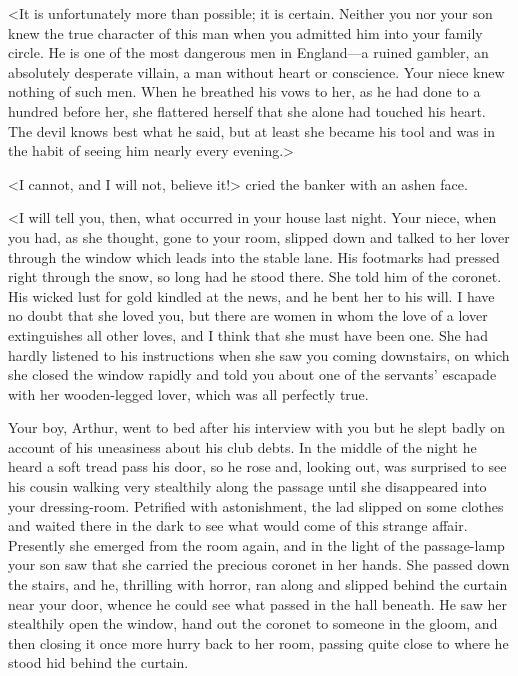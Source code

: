 <It is unfortunately more than possible; it is certain. Neither you nor your son knew the true character of this man when you admitted him into your family circle. He is one of the most dangerous men in England—a ruined gambler, an absolutely desperate villain, a man without heart or conscience. Your niece knew nothing of such men. When he breathed his vows to her, as he had done to a hundred before her, she flattered herself that she alone had touched his heart. The devil knows best what he said, but at least she became his tool and was in the habit of seeing him nearly every evening.>

<I cannot, and I will not, believe it!> cried the banker with an ashen face.

<I will tell you, then, what occurred in your house last night. Your niece, when you had, as she thought, gone to your room, slipped down and talked to her lover through the window which leads into the stable lane. His footmarks had pressed right through the snow, so long had he stood there. She told him of the coronet. His wicked lust for gold kindled at the news, and he bent her to his will. I have no doubt that she loved you, but there are women in whom the love of a lover extinguishes all other loves, and I think that she must have been one. She had hardly listened to his instructions when she saw you coming downstairs, on which she closed the window rapidly and told you about one of the servants' escapade with her wooden-legged lover, which was all perfectly true.

Your boy, Arthur, went to bed after his interview with you but he slept badly on account of his uneasiness about his club debts. In the middle of the night he heard a soft tread pass his door, so he rose and, looking out, was surprised to see his cousin walking very stealthily along the passage until she disappeared into your dressing-room. Petrified with astonishment, the lad slipped on some clothes and waited there in the dark to see what would come of this strange affair. Presently she emerged from the room again, and in the light of the passage-lamp your son saw that she carried the precious coronet in her hands. She passed down the stairs, and he, thrilling with horror, ran along and slipped behind the curtain near your door, whence he could see what passed in the hall beneath. He saw her stealthily open the window, hand out the coronet to someone in the gloom, and then closing it once more hurry back to her room, passing quite close to where he stood hid behind the curtain.

